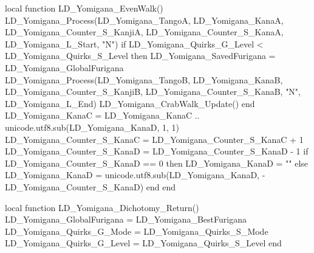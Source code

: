 {			local function LD_Yomigana_EvenWalk()
				LD_Yomigana_Process(LD_Yomigana_TangoA, LD_Yomigana_KanaA, LD_Yomigana_Counter_S_KanjiA, LD_Yomigana_Counter_S_KanaA, 	LD_Yomigana_L_Start, "N") 
				if LD_Yomigana_Quirks_G_Level < LD_Yomigana_Quirks_S_Level then %
					LD_Yomigana_SavedFurigana = LD_Yomigana_GlobalFurigana
					LD_Yomigana_Process(LD_Yomigana_TangoB, LD_Yomigana_KanaB, LD_Yomigana_Counter_S_KanjiB, LD_Yomigana_Counter_S_KanaB, "N", LD_Yomigana_L_End) 
					LD_Yomigana_CrabWalk_Update()
				end
				LD_Yomigana_KanaC =  LD_Yomigana_KanaC .. unicode.utf8.sub(LD_Yomigana_KanaD, 1, 1) 
				LD_Yomigana_Counter_S_KanaC = LD_Yomigana_Counter_S_KanaC + 1
				LD_Yomigana_Counter_S_KanaD = LD_Yomigana_Counter_S_KanaD - 1
				if LD_Yomigana_Counter_S_KanaD == 0 then
					LD_Yomigana_KanaD = ""
				else
					LD_Yomigana_KanaD = unicode.utf8.sub(LD_Yomigana_KanaD, -LD_Yomigana_Counter_S_KanaD)
				end
			end
		

			
			
			local function LD_Yomigana_Dichotomy_Return()
				LD_Yomigana_GlobalFurigana = LD_Yomigana_BestFurigana
				LD_Yomigana_Quirks_G_Mode = LD_Yomigana_Quirks_S_Mode
				LD_Yomigana_Quirks_G_Level = LD_Yomigana_Quirks_S_Level
			end
		
	
		
}
